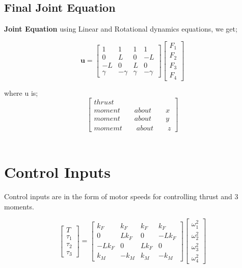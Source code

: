 \subsection{Final Joint Equation}

\textbf{Joint Equation} using Linear and Rotational dynamics equations, we get;

\[
\textbf{u} = \begin{bmatrix}
    1 & 1 & 1 & 1 \\
    0 & L & 0 & -L \\
    -L & 0 & L & 0 \\
    \gamma & -\gamma & \gamma & -\gamma
\end{bmatrix}
\begin{bmatrix}
    F_1 \\
    F_2 \\
    F_3 \\
    F_4 
\end{bmatrix}
\]

where u is;
\[
\begin{bmatrix}
    thrust \\
    moment\qquad about\qquad x \\
    moment\qquad about\qquad y \\
    momemt\qquad about\qquad z 
\end{bmatrix}
\]
\\

\section{Control Inputs}

Control inputs are in the form of motor speeds for controlling thrust and 3 moments.
\vspace{10pt}

\[
\begin{bmatrix}
    T \\
    \tau_1 \\
    \tau_2 \\
    \tau_3
\end{bmatrix} = 
\begin{bmatrix}
    k_F & k_F & k_F & k_F \\
    0 & Lk_F & 0 & -Lk_F \\
    -Lk_F & 0 & Lk_F & 0 \\
    k_M & -k_M & k_M & -k_M
\end{bmatrix}
\begin{bmatrix}
    \omega_1^2 \\
    \omega_2^2 \\
    \omega_3^2 \\
    \omega_4^2
\end{bmatrix}
\]
\\


